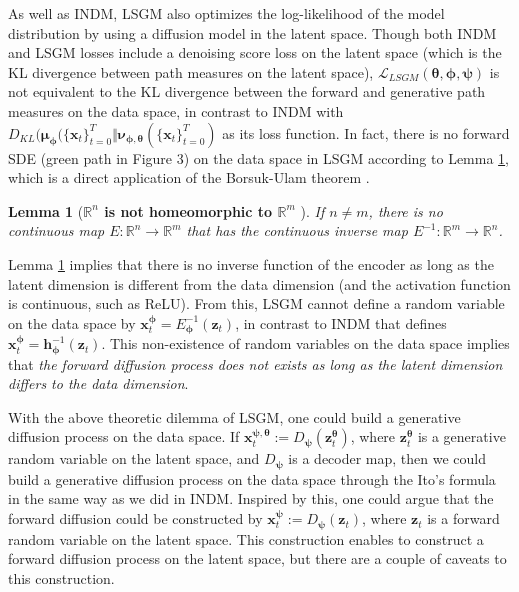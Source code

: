 \documentclass{article}
\newtheorem{lemma}{Lemma}
\theoremstyle{definition}
\theoremstyle{remark}
\begin{document}
	As well as INDM, LSGM also optimizes the log-likelihood of the model distribution by using a diffusion model in the latent space. Though both INDM and LSGM losses include a denoising score loss on the latent space (which is the KL divergence between path measures on the latent space), $\mathcal{L}_{LSGM}(\bm{\theta},\bm{\phi},\bm{\psi})$ is not equivalent to the KL divergence between the forward and generative path measures on the data space, in contrast to INDM with $D_{KL}(\bm{\mu}_{\bm{\phi}}(\{\mathbf{x}_{t}\}_{t=0}^{T}\Vert\bm{\nu}_{\bm{\phi},\bm{\theta}}(\{\mathbf{x}_{t}\}_{t=0}^{T})$ as its loss function. In fact, there is no forward SDE (green path in Figure 3) on the data space in LSGM according to Lemma \ref{lemma:3}, which is a direct application of the Borsuk-Ulam theorem \cite{bredon2013topology}. 
	\begin{lemma}[\textbf{$\mathbb{R}^{n}$ is not homeomorphic to $\mathbb{R}^{m}$} \cite{bredon2013topology}]\label{lemma:3}
		If $n\neq m$, there is no continuous map $E:\mathbb{R}^{n}\rightarrow\mathbb{R}^{m}$ that has the continuous inverse map $E^{-1}:\mathbb{R}^{m}\rightarrow\mathbb{R}^{n}$.
	\end{lemma}
	Lemma \ref{lemma:3} implies that there is no inverse function of the encoder as long as the latent dimension is different from the data dimension (and the activation function is continuous, such as ReLU). From this, LSGM cannot define a random variable on the data space by $\mathbf{x}_{t}^{\bm{\phi}}=E_{\bm{\phi}}^{-1}(\mathbf{z}_{t})$, in contrast to INDM that defines $\mathbf{x}_{t}^{\bm{\phi}}=\mathbf{h}_{\bm{\phi}}^{-1}(\mathbf{z}_{t})$. This non-existence of random variables on the data space implies that \textit{the forward diffusion process does not exists as long as the latent dimension differs to the data dimension}.
	
	With the above theoretic dilemma of LSGM, one could build a generative diffusion process on the data space. If $\mathbf{x}_{t}^{\bm{\psi},\bm{\theta}}:=D_{\bm{\psi}}(\mathbf{z}_{t}^{\bm{\theta}})$, where $\mathbf{z}_{t}^{\bm{\theta}}$ is a generative random variable on the latent space, and $D_{\bm{\psi}}$ is a decoder map, then we could build a generative diffusion process on the data space through the Ito's formula in the same way as we did in INDM. Inspired by this, one could argue that the forward diffusion could be constructed by $\mathbf{x}_{t}^{\bm{\psi}}:=D_{\bm{\psi}}(\mathbf{z}_{t})$, where $\mathbf{z}_{t}$ is a forward random variable on the latent space. This construction enables to construct a forward diffusion process on the latent space, but there are a couple of caveats to this construction.
	
\end{document}

